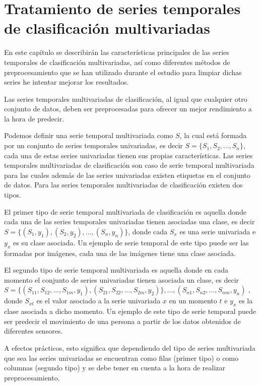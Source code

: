 \chapter{Tratamiento de series temporales de clasificación multivariadas}
En este capítulo se describirán las características principales de las series temporales de clasificación multivariadas, así como diferentes métodos de preprocesamiento que se han utilizado durante el estudio para limpiar dichas series he intentar mejorar los resultados.\newline

Las series temporales multivariadas de clasificación, al igual que cualquier otro conjunto de datos, deben ser preprocesadas para ofrecer un mejor rendimiento a la hora de predecir.\newline

Podemos definir una serie temporal multivariada como $S$, la cual está formada por un conjunto de series temporales univariadas, es decir $S = \{S_1,S_2,...,S_n\}$, cada una de estas series univariadas tienen sus propias características. Las series temporales multivariadas de clasificación son caso de serie temporal multivariada para las cuales además de las series univariadas existen etiquetas en el conjunto de datos. Para las series temporales multivariadas de clasificación existen dos tipos. \newline

El primer tipo de serie temporal multivariada de clasificación es aquella donde cada una de las series temporales univariadas tienen asociadas una clase, es decir $ S = \{(S_1,y_1), (S_2,y_2), ..., (S_n,y_n)\}$, donde cada $S_x$ es una serie univariada e $y_x$ es su clase asociada. Un ejemplo de serie temporal de este tipo puede ser las formadas por imágenes, cada una de las imágenes tiene una clase asociada.\newline

El segundo tipo de serie temporal multivariada es aquella donde en cada momento el conjunto de series univariadas tienen asociada un clase, es decir $S = \{(S_{11},S_{12},...,S_{1m},y_1),(S_{21},S_{22},...,S_{2m},y_2)\}, ..., (S_{n1},S_{n2},...,S_{nm},y_n) $ , donde $S_{xt}$ es el valor asociado a la serie univariada $x$ en un momento $t$ e $y_x$ es la clase asociada a dicho momento. Un ejemplo de este tipo de serie temporal puede ser predecir el movimiento de una persona a partir de los datos obtenidos de diferentes sensores.\newline

A efectos prácticos, esto significa que dependiendo del tipo de series multivariada que sea las series univariadas se encuentran como filas (primer tipo) o como columnas (segundo tipo) y se debe tener en cuenta a la hora de realizar preprocesamiento.\newline

